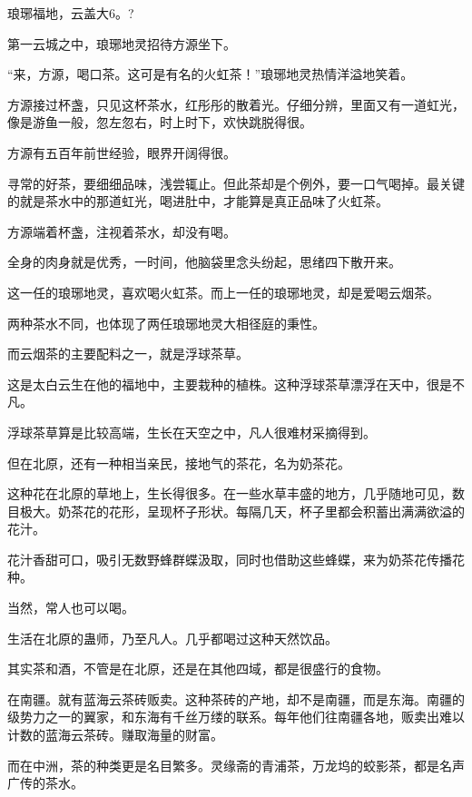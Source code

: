 
\begin{this_body}



琅琊福地，云盖大6。?

第一云城之中，琅琊地灵招待方源坐下。

“来，方源，喝口茶。这可是有名的火虹茶！”琅琊地灵热情洋溢地笑着。

方源接过杯盏，只见这杯茶水，红彤彤的散着光。仔细分辨，里面又有一道虹光，像是游鱼一般，忽左忽右，时上时下，欢快跳脱得很。

方源有五百年前世经验，眼界开阔得很。

寻常的好茶，要细细品味，浅尝辄止。但此茶却是个例外，要一口气喝掉。最关键的就是茶水中的那道虹光，喝进肚中，才能算是真正品味了火虹茶。

方源端着杯盏，注视着茶水，却没有喝。

全身的肉身就是优秀，一时间，他脑袋里念头纷起，思绪四下散开来。

这一任的琅琊地灵，喜欢喝火虹茶。而上一任的琅琊地灵，却是爱喝云烟茶。

两种茶水不同，也体现了两任琅琊地灵大相径庭的秉性。

而云烟茶的主要配料之一，就是浮球茶草。

这是太白云生在他的福地中，主要栽种的植株。这种浮球茶草漂浮在天中，很是不凡。

浮球茶草算是比较高端，生长在天空之中，凡人很难材采摘得到。

但在北原，还有一种相当亲民，接地气的茶花，名为奶茶花。

这种花在北原的草地上，生长得很多。在一些水草丰盛的地方，几乎随地可见，数目极大。奶茶花的花形，呈现杯子形状。每隔几天，杯子里都会积蓄出满满欲溢的花汁。

花汁香甜可口，吸引无数野蜂群蝶汲取，同时也借助这些蜂蝶，来为奶茶花传播花种。

当然，常人也可以喝。

生活在北原的蛊师，乃至凡人。几乎都喝过这种天然饮品。

其实茶和酒，不管是在北原，还是在其他四域，都是很盛行的食物。

在南疆。就有蓝海云茶砖贩卖。这种茶砖的产地，却不是南疆，而是东海。南疆的级势力之一的翼家，和东海有千丝万缕的联系。每年他们往南疆各地，贩卖出难以计数的蓝海云茶砖。赚取海量的财富。

而在中洲，茶的种类更是名目繁多。灵缘斋的青浦茶，万龙坞的蛟影茶，都是名声广传的茶水。


\end{this_body}
